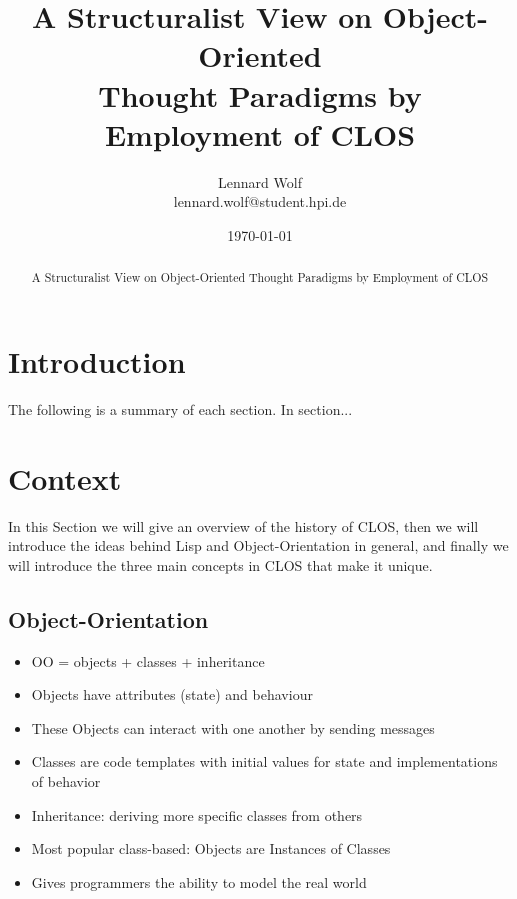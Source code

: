 \documentclass[oribibl]{llncs}
\author{Lennard Wolf \\
        lennard.wolf@student.hpi.de}
\institute{ Hasso Plattner Institute \\
            Prof.-Dr.-Helmert-Straße 2-3 \\
            14482 Potsdam \\
            Germany}
\title{A Structuralist View on Object-Oriented \\ Thought Paradigms by Employment of CLOS}
\date{\today}
\begin{document}
\thispagestyle{empty}
\vfill

%
\maketitle
%
\begin{abstract}
A Structuralist View on Object-Oriented Thought Paradigms by Employment of CLOS
\end{abstract}
%
\section{Introduction}







The following is a summary of each section. In section...

\section{Context}
\label{sec:context}
In this Section we will give an overview of the history of CLOS, then we will introduce the ideas behind Lisp and Object-Orientation in general, and finally we will introduce the three main concepts in CLOS that make it unique.

\subsection{Object-Orientation}
\label{sec:oo}

\begin{itemize}
\item OO = objects + classes + inheritance
\item Objects have attributes (state) and behaviour 
\item These Objects can interact with one another by sending messages
\item Classes are code templates with initial values for state and implementations of behavior
\item Inheritance: deriving more specific classes from others 
\item Most popular class-based: Objects are Instances of Classes
\item Gives programmers the ability to model the real world
\end{itemize}
\end{document}
